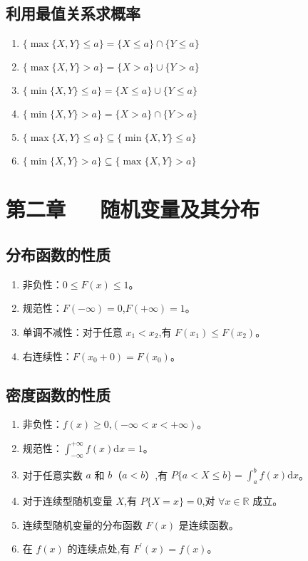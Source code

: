 \documentclass[UTF8]{ctexart}
\theoremstyle{remark}
\begin{document}
		\subsection{利用最值关系求概率}
		\begin{enumerate}
		\item \(\{\max\{X,Y\} \leq a\} = \{X \leq a\} \cap \{Y \leq a\}\)
		\item \(\{\max\{X,Y\} > a\} = \{X > a\} \cup \{Y > a\}\)
		\item \(\{\min\{X,Y\} \leq a\} = \{X \leq a\} \cup \{Y \leq a\}\)
		\item \(\{\min\{X,Y\} > a\} = \{X > a\} \cap \{Y > a\}\)
		\item \(\{\max\{X,Y\} \leq a\} \subseteq \{\min\{X,Y\} \leq a\}\)
		\item \(\{\min\{X,Y\} > a\} \subseteq \{\max\{X,Y\} > a\}\)
		\end{enumerate}
		
		\section{第二章~~~随机变量及其分布}
		\subsection{分布函数的性质}
		\begin{enumerate}
			\item 非负性：\(0 \leq F(x) \leq 1\)。
			\item 规范性：\(F(-\infty) = 0\),\(F(+\infty) = 1\)。
			\item 单调不减性：对于任意 \(x_1 < x_2\),有 \(F(x_1) \leq F(x_2)\)。
			\item 右连续性：\(F(x_0 + 0) = F(x_0)\)。
		\end{enumerate}
		
		\subsection{密度函数的性质}
		\begin{enumerate}
			\item 非负性：\(f(x) \geq 0\),\((-\infty < x < +\infty)\)。
			\item 规范性：\(\int_{-\infty}^{+\infty} f(x) \mathrm{d}x = 1\)。
			\item 对于任意实数 \(a\) 和 \(b\)（\(a < b\)）,有 \(P\{a < X \leq b\} = \int_{a}^{b} f(x) \mathrm{d}x\)。
			\item 对于连续型随机变量 \(X\),有 \(P\{X = x\} = 0\),对 \(\forall x \in \mathbb{R}\) 成立。
			\item 连续型随机变量的分布函数 \(F(x)\) 是连续函数。
			\item 在 \(f(x)\) 的连续点处,有 \(F^\prime(x) = f(x)\)。
		\end{enumerate}
		
\end{document}
